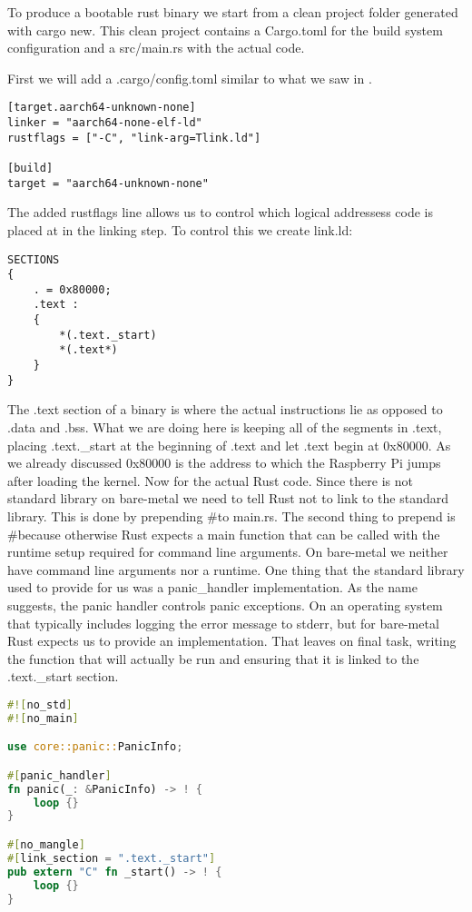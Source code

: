 To produce a bootable rust binary we start from a clean project folder generated with cargo new.
This clean project contains a Cargo.toml for the build system configuration and a src/main.rs with the actual code.

First we will add a .cargo/config.toml similar to what we saw in .
\begin{verbatim}
[target.aarch64-unknown-none]
linker = "aarch64-none-elf-ld"
rustflags = ["-C", "link-arg=Tlink.ld"]
    
[build]
target = "aarch64-unknown-none"
\end{verbatim}
The added rustflags line allows us to control which logical addressess code is placed at in the linking step.
To control this we create link.ld:
\begin{verbatim}
SECTIONS
{
    . = 0x80000;
    .text :
    {
        *(.text._start)
        *(.text*)
    }
}
\end{verbatim}
The .text section of a binary is where the actual instructions lie as opposed to .data and .bss.
What we are doing here is keeping all of the segments in .text, placing .text.\_start at the beginning of .text and let .text begin at 0x80000.
As we already discussed 0x80000 is the address to which the Raspberry Pi jumps after loading the kernel.
Now for the actual Rust code. Since there is not standard library on bare-metal we need to tell Rust not to link to the standard library.
This is done by prepending \#\![no\_std] to main.rs.
The second thing to prepend is \#\![no\_main] because otherwise Rust expects a main function that can be called with the runtime setup required for command line arguments.
On bare-metal we neither have command line arguments nor a runtime.
One thing that the standard library used to provide for us was a panic\_handler implementation.
As the name suggests, the panic handler controls panic exceptions.
On an operating system that typically includes logging the error message to stderr, but for bare-metal Rust expects us to provide an implementation.
That leaves on final task, writing the function that will actually be run and ensuring that it is linked to the .text.\_start section.
\begin{lstlisting}[language=Rust,style=colouredRust]
#![no_std]
#![no_main]

use core::panic::PanicInfo;

#[panic_handler]
fn panic(_: &PanicInfo) -> ! {
    loop {}
}

#[no_mangle]
#[link_section = ".text._start"]
pub extern "C" fn _start() -> ! {
	loop {}
}
\end{lstlisting}

